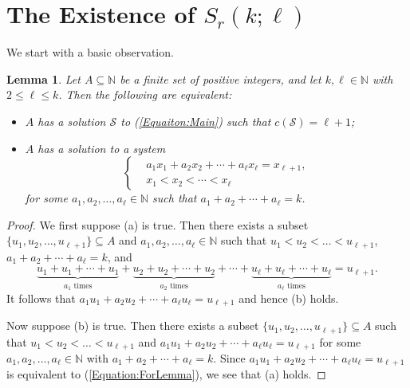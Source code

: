 \documentclass[11pt]{article}
\newtheorem{lemma}[theorem]{Lemma}
\theoremstyle{definition}
\begin{document}
\section{The Existence of $S_r(k;\ell)$}\label{Section:Existence} 
We start with a basic observation.
\begin{lemma}\label{Lemma:Disjunctive}
Let $A\subseteq\mathbb{N}$ be a finite set of positive integers, and let $k,\ell\in\mathbb{N}$ with $2\leq\ell\leq k$. Then the following are equivalent:
\begin{itemize}
\item[(a)] $A$ has a solution $\mathcal{S}$ to (\ref{Equaiton:Main}) such that $c(\mathcal{S})=\ell+1$;
\item[(b)] $A$ has a solution to a system
\[
\left\{
\begin{split}
&a_1x_1+a_2x_2+\cdots+a_\ell x_\ell=x_{\ell+1},\\
&x_1<x_2<\cdots<x_\ell
\end{split}\right.
\]
for some $a_1,a_2,\ldots,a_\ell\in\mathbb{N}$ such that $a_1+a_2+\cdots+a_\ell=k$.
\end{itemize}
\end{lemma}
\begin{proof}
We first suppose (a) is true. Then there exists a subset $\{u_1,u_2,\ldots,u_{\ell+1}\}\subseteq A$ and $a_1,a_2,\ldots,a_\ell\in\mathbb{N}$ such that $u_1<u_2<\ldots<u_{\ell+1}$, $a_1+a_2+\cdots+a_\ell=k$, and
\begin{equation}\label{Equation:ForLemma}
\underbrace{u_1+u_1+\cdots+u_1}_{a_1\text{ times}}+\underbrace{u_2+u_2+\cdots+u_2}_{a_2\text{ times}}+\cdots+\underbrace{u_\ell+u_\ell+\cdots+u_\ell}_{a_\ell\text{ times}}=u_{\ell+1}.
\end{equation}
It follows that $a_1u_1+a_2u_2+\cdots+a_\ell u_\ell=u_{\ell+1}$ and hence (b) holds.

Now suppose (b) is true. Then there exists a subset $\{u_1,u_2,\ldots,u_{\ell+1}\}\subseteq A$ such that $u_1<u_2<\ldots<u_{\ell+1}$ and $a_1u_1+a_2u_2+\cdots+a_\ell u_\ell=u_{\ell+1}$ for some $a_1,a_2,\ldots,a_\ell\in\mathbb{N}$ with $a_1+a_2+\cdots+a_\ell=k$. Since $a_1u_1+a_2u_2+\cdots+a_\ell u_\ell=u_{\ell+1}$ is equivalent to (\ref{Equation:ForLemma}), we see that (a) holds.
\end{proof}
\end{document}
